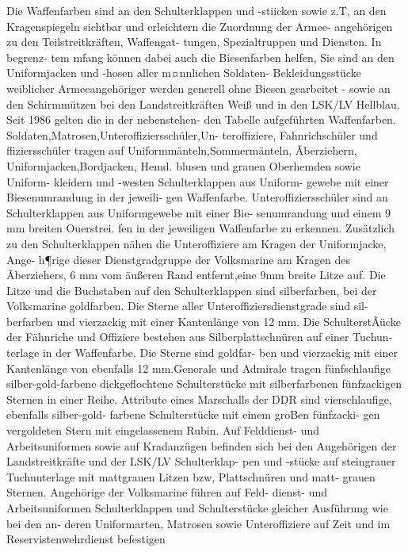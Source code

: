 

Die Waffenfarben sind an den Schulterklappen
und -stiicken sowie z.T, an den Kragenspiegeln
sichtbar und erleichtern die Zuordnung der Armee-
angehörigen zu den Teilstreitkräften, Waffengat-
tungen, Spezialtruppen und Diensten. In begrenz-
tem mfang können dabei auch die Biesenfarben
helfen, Sie sind an den Uniformjacken und -hosen
aller m¤nnlichen Soldaten- Bekleidungsstücke
weiblicher Armeeangehöriger werden generell ohne
Biesen gearbeitet - sowie an den Schirmmützen bei
den Landstreitkräften Weiß und in den LSK/LV
Hellblau. Seit 1986 gelten die in der nebenstehen-
den Tabelle aufgeführten Waffenfarben.
Soldaten,Matrosen,Unteroffiziersschüler,Un-
teroffiziere, Fahnrichschüler und ffiziersschüler
tragen auf
Uniformmänteln,Sommermänteln,
Ãberziehern, Uniformjacken,Bordjacken, Hemd.
blusen und grauen Oberhemden sowie Uniform-
kleidern und -westen Schulterklappen aus Uniform-
gewebe mit einer Biesenumrandung in der jeweili-
gen Waffenfarbe. Unteroffiziersschüler sind an
Schulterklappen aus Uniformgewebe mit einer Bie-
senumrandung und einem 9 mm breiten Ouerstrei.
fen in der jeweiligen Waffenfarbe zu erkennen.
Zusätzlich zu den Schulterklappen nähen die
Unteroffiziere am Kragen der Uniformjacke, Ange-
h¶rige dieser Dienstgradgruppe der Volksmarine
am Kragen des Ãberziehers, 6 mm vom äußeren
Rand entfernt,eine 9mm breite Litze auf. Die
Litze und die Buchstaben auf den Schulterklappen sind silberfarben, bei der Volksmarine goldfarben.
Die Sterne aller Unteroffiziersdienstgrade sind sil-
berfarben und vierzackig mit einer Kantenlänge
von 12 mm.
Die SchulterstÃücke der Fähnriche und Offiziere
bestehen aus Silberplattschnüren auf einer Tuchun-
terlage in der Waffenfarbe. Die Sterne sind goldfar-
ben und vierzackig mit einer Kantenlänge von
ebenfalls 12 mm.Generale und Admirale tragen
fünfschlaufige silber-gold-farbene dickgeflochtene
Schulterstücke mit silberfarbenen fünfzackigen Sternen in einer Reihe. Attribute eines Marschalls
der DDR sind vierschlaufige, ebenfalls silber-gold-
farbene Schulterstücke mit einem groBen fünfzacki-
gen vergoldeten Stern mit eingelassenem Rubin.
Auf Felddienst- und Arbeitsuniformen sowie auf
Kradanzügen befinden sich bei den Angehörigen
der Landstreitkräfte und der LSK/LV Schulterklap-
pen und -stücke auf steingrauer Tuchunterlage mit
mattgrauen Litzen bzw, Plattschnüren und matt-
grauen Sternen.
Angehörige der Volksmarine führen auf Feld-
dienst- und Arbeitsuniformen Schulterklappen und
Schulterstücke gleicher Ausführung wie bei den an-
deren Uniformarten, Matrosen sowie Unteroffiziere
auf Zeit und im Reservistenwehrdienst befestigen

